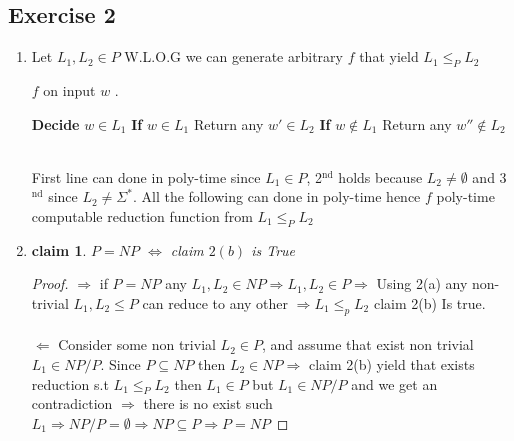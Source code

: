 \documentclass[12pt]{article}
\newtheorem*{claim*}{claim}
\begin{document}
\subsection{Exercise 2} \begin{enumerate}[label=(\alph*)]
\item {}

Let $L_1,L_2\in P$ W.L.O.G we can generate arbitrary $f$ that yield $L_1\le_P L_2$ 
\begin{algorithm}
\caption{ $f$ on input $w$ .}\label{alg:cap}
\begin{algorithmic} 
\State  \textbf{Decide}  $w\in L_1$
\State \textbf{If} $w\in L_1$  Return any $w'\in L_2$
\State \textbf{If} $w\notin L_1$  Return any $w''\notin L_2$
\end{algorithmic}
\end{algorithm}
\\First line can  done in poly-time since $L_1\in P$, 2$^{\text{nd}}$ holds  because $L_2\ne \emptyset$ and 3$^{\text{nd}}$ since
$L_2\ne \Sigma ^*$. All the following can done in poly-time hence $f$  poly-time computable reduction function from $L_1\le_P L_2$ \\
\item {}
\begin{claim*} $P=NP$ $ \Leftrightarrow$  claim $2(b)$ is True
\end{claim*}
\begin{proof}$\Rightarrow$ if $P=NP$ any $L_1,L_2\in NP \Rightarrow L_1,L_2\in P \Rightarrow $  Using 2(a)  any non-trivial $L_1,L_2 \le P$  can reduce to any other $\Rightarrow L_1\le_pL_2$ claim 2(b) Is true.
\\\\ $\Leftarrow$ Consider  some non trivial $L_2\in P$,  and assume that exist non trivial $L_1\in NP/P$. Since $P\subseteq NP$ then $L_2\in NP \Rightarrow$ claim 2(b) yield that exists reduction s.t $L_1 \le_P  L_2$ then $L_1\in P$ but  $L_1\in NP/P $ and we get an contradiction $\Rightarrow$ there is no exist such $L_1\Rightarrow NP/ P=\emptyset \Rightarrow NP\subseteq P\Rightarrow P=NP$
\end{proof}



\end{enumerate}
\end{document}

